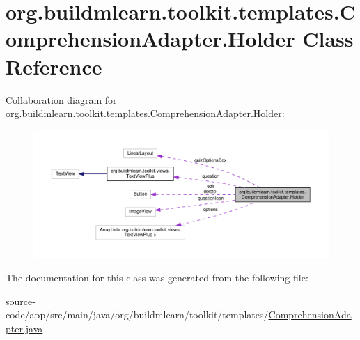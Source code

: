 \hypertarget{classorg_1_1buildmlearn_1_1toolkit_1_1templates_1_1ComprehensionAdapter_1_1Holder}{}\section{org.\+buildmlearn.\+toolkit.\+templates.\+Comprehension\+Adapter.\+Holder Class Reference}
\label{classorg_1_1buildmlearn_1_1toolkit_1_1templates_1_1ComprehensionAdapter_1_1Holder}


Collaboration diagram for org.\+buildmlearn.\+toolkit.\+templates.\+Comprehension\+Adapter.\+Holder\+:
\nopagebreak
\begin{figure}[H]
\begin{center}
\leavevmode
\includegraphics[width=350pt]{classorg_1_1buildmlearn_1_1toolkit_1_1templates_1_1ComprehensionAdapter_1_1Holder__coll__graph}
\end{center}
\end{figure}


The documentation for this class was generated from the following file\+:\begin{DoxyCompactItemize}
\item 
source-\/code/app/src/main/java/org/buildmlearn/toolkit/templates/\hyperlink{ComprehensionAdapter_8java}{Comprehension\+Adapter.\+java}\end{DoxyCompactItemize}
